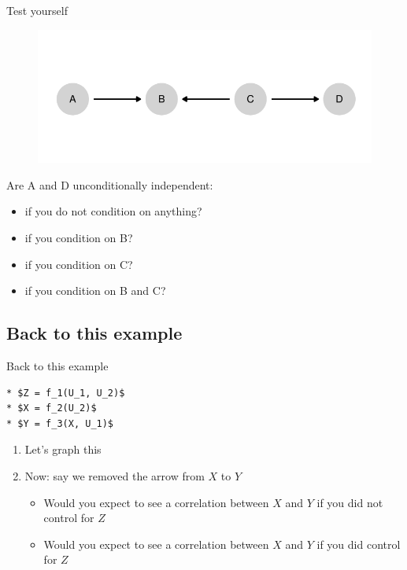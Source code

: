 \documentclass[
  11pt,
  ignorenonframetext,
]{beamer}
\providecommand{\tightlist}{%
  \setlength{\itemsep}{0pt}\setlength{\parskip}{0pt}}\usepackage{longtable,booktabs,array}
\begin{document}
\begin{frame}{Test yourself}
\begin{figure}

{\centering \includegraphics{0_lectures_files/figure-beamer/unnamed-chunk-224-1.pdf}

}

\end{figure}

Are A and D unconditionally independent:

\begin{itemize}
\tightlist
\item
  if you do not condition on anything?
\item
  if you condition on B?
\item
  if you condition on C?
\item
  if you condition on B and C?
\end{itemize}
\end{frame}

\hypertarget{back-to-this-example}{%
\subsection{Back to this example}\label{back-to-this-example}}

\begin{frame}[fragile]{Back to this example}
\begin{verbatim}
* $Z = f_1(U_1, U_2)$
* $X = f_2(U_2)$
* $Y = f_3(X, U_1)$
\end{verbatim}

\begin{enumerate}
\tightlist
\item
  Let's graph this
\item
  Now: say we removed the arrow from \(X\) to \(Y\)

  \begin{itemize}
  \tightlist
  \item
    Would you expect to see a correlation between \(X\) and \(Y\) if you
    did not control for \(Z\)
  \item
    Would you expect to see a correlation between \(X\) and \(Y\) if you
    did control for \(Z\)
  \end{itemize}
\end{enumerate}
\end{frame}
\end{document}
